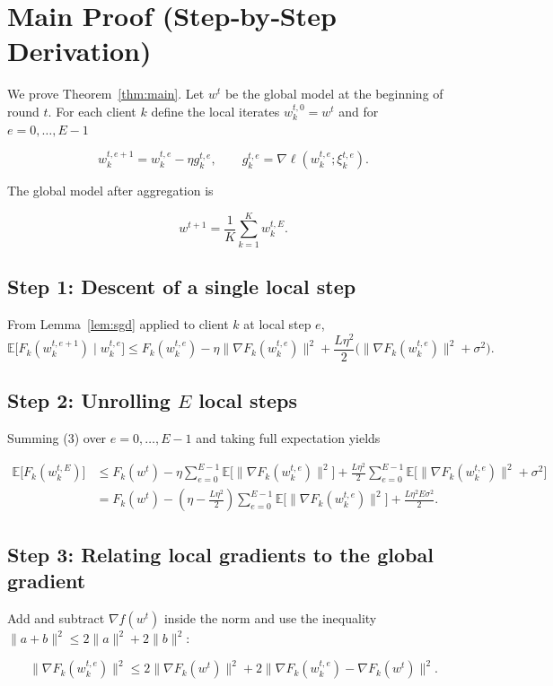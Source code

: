 \documentclass{article}
\newcommand{\E}{\mathbb{E}}
\begin{document}
\section*{Main Proof (Step‑by‑Step Derivation)}
We prove Theorem~\ref{thm:main}. Let $w^{t}$ be the global model at the beginning of round $t$.
For each client $k$ define the local iterates $w^{t,0}_{k}=w^{t}$ and for $e=0,\dots,E-1$  

\[
w^{t,e+1}_{k}=w^{t,e}_{k}-\eta g^{t,e}_{k},\qquad 
g^{t,e}_{k}= \nabla\ell(w^{t,e}_{k};\xi^{t,e}_{k}).
\tag{1}
\]

The global model after aggregation is  

\[
w^{t+1}= \frac{1}{K}\sum_{k=1}^{K} w^{t,E}_{k}.
\tag{2}
\]

\subsection*{Step 1: Descent of a single local step}
From Lemma~\ref{lem:sgd} applied to client $k$ at local step $e$,
\[
\E\big[F_k(w^{t,e+1}_{k})\mid w^{t,e}_{k}\big]
\le
F_k(w^{t,e}_{k})-\eta\|\nabla F_k(w^{t,e}_{k})\|^{2}
+\frac{L\eta^{2}}{2}\big(\|\nabla F_k(w^{t,e}_{k})\|^{2}+\sigma^{2}\big).
\tag{3}
\]

\subsection*{Step 2: Unrolling $E$ local steps}
Summing (3) over $e=0,\dots,E-1$ and taking full expectation yields

\[
\begin{aligned}
\E\big[F_k(w^{t,E}_{k})\big]
&\le
F_k(w^{t})-\eta\sum_{e=0}^{E-1}\E\!\big[\|\nabla F_k(w^{t,e}_{k})\|^{2}\big]
+\frac{L\eta^{2}}{2}\sum_{e=0}^{E-1}\E\!\big[\|\nabla F_k(w^{t,e}_{k})\|^{2}+\sigma^{2}\big]  \\
&=F_k(w^{t})-(\eta-\tfrac{L\eta^{2}}{2})\sum_{e=0}^{E-1}\E\!\big[\|\nabla F_k(w^{t,e}_{k})\|^{2}\big]
+\frac{L\eta^{2}E\sigma^{2}}{2}.
\end{aligned}
\tag{4}
\]

\subsection*{Step 3: Relating local gradients to the global gradient}
Add and subtract $\nabla f(w^{t})$ inside the norm and use the inequality 
$\|a+b\|^{2}\le2\|a\|^{2}+2\|b\|^{2}$:

\[
\|\nabla F_k(w^{t,e}_{k})\|^{2}
\le 2\|\nabla F_k(w^{t})\|^{2}+2\|\nabla F_k(w^{t,e}_{k})-\nabla F_k(w^{t})\|^{2}.
\tag{5}
\]
\end{document}
